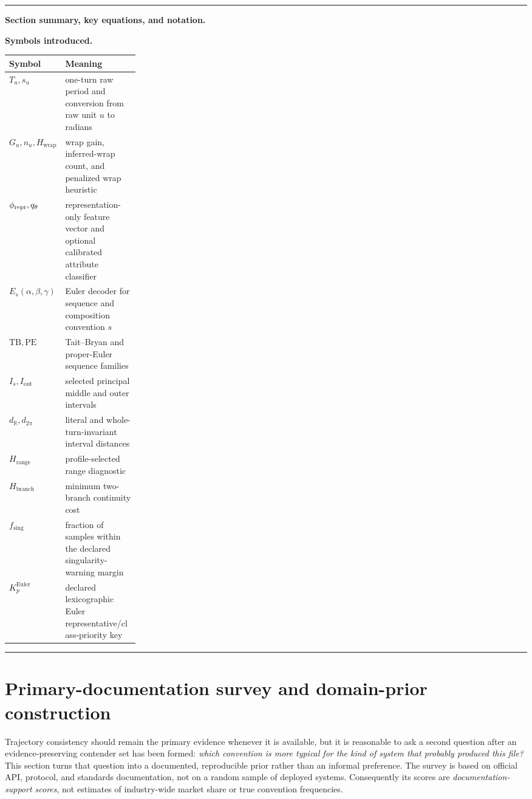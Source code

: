 \documentclass[11pt]{article}
\newcommand{\R}{\mathbb{R}}
\newcommand{\TB}{\mathrm{TB}}
\newcommand{\PE}{\mathrm{PE}}
\newenvironment{sectionrecap}
{\par\medskip\begingroup\small\noindent\rule{\linewidth}{0.4pt}\par
\smallskip\noindent\textbf{Section summary, key equations, and notation.}\par\smallskip}
{\par\smallskip\noindent\rule{\linewidth}{0.4pt}\par\endgroup\medskip}
\begin{document}
\begin{sectionrecap}
        \noindent\textbf{Symbols introduced.}
        \par\noindent\begin{tabularx}{\linewidth}{@{}p{0.25\linewidth}Y@{}}
\toprule
Symbol & Meaning \\
\midrule
$T_u,s_u$ & one-turn raw period and conversion from raw unit $u$ to radians \\
$G_u,n_u,H_{\mathrm{wrap}}$ & wrap gain, inferred-wrap count, and penalized wrap heuristic \\
$\phi_{\rm repr},q_\theta$ & representation-only feature vector and optional calibrated attribute classifier \\
$E_s(\alpha,\beta,\gamma)$ & Euler decoder for sequence and composition convention $s$ \\
$\TB,\PE$ & Tait--Bryan and proper-Euler sequence families \\
$I_s,I_{\mathrm{out}}$ & selected principal middle and outer intervals \\
$d_{\R},d_{2\pi}$ & literal and whole-turn-invariant interval distances \\
$H_{\mathrm{range}}$ & profile-selected range diagnostic \\
$H_{\mathrm{branch}}$ & minimum two-branch continuity cost \\
$f_{\mathrm{sing}}$ & fraction of samples within the declared singularity-warning margin \\
$K_p^{\mathrm{Euler}}$ & declared lexicographic Euler representative/class-priority key \\
\bottomrule
        \end{tabularx}
    \end{sectionrecap}


    \section{Primary-documentation survey and domain-prior construction}\label{app:survey}

    Trajectory consistency should remain the primary evidence whenever it is available, but
    it is reasonable to ask a second question after an evidence-preserving contender set has
    been formed: \emph{which convention is more typical for the kind of system that probably
    produced this file?}  This section turns that question into a documented, reproducible
    prior rather than an informal preference. The survey is based on official API,
    protocol, and standards documentation, not on a random sample of deployed systems.
    Consequently its scores are \emph{documentation-support scores}, not estimates of
    industry-wide market share or true convention frequencies.
\end{document}
